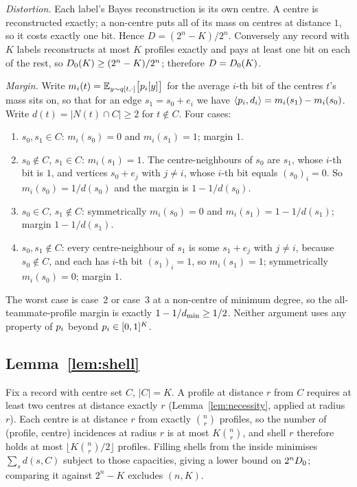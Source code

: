 \emph{Distortion.} Each label's Bayes reconstruction is its own centre. A centre
is reconstructed exactly; a non-centre puts all of its mass on centres at
distance $1$, so it costs exactly one bit. Hence $D = (2^n - K)/2^n$. Conversely
any record with $K$ labels reconstructs at most $K$ profiles exactly and pays at
least one bit on each of the rest, so $D_0(K) \ge (2^n-K)/2^n$; therefore
$D = D_0(K)$.

\emph{Margin.} Write $m_i(t) = \mathbb{E}_{y \sim q[t,\cdot]}\bigl[p_i[y]\bigr]$
for the average $i$-th bit of the centres $t$'s mass sits on, so that for an edge
$s_1 = s_0 + e_i$ we have
$\langle p_i, d_i \rangle = m_i(s_1) - m_i(s_0)$. Write
$d(t) = |N(t) \cap C| \ge 2$ for $t \notin C$. Four cases:
\begin{enumerate}
\item $s_0, s_1 \in C$: $m_i(s_0) = 0$ and $m_i(s_1) = 1$; margin $1$.
\item $s_0 \notin C$, $s_1 \in C$: $m_i(s_1) = 1$. The centre-neighbours of $s_0$
      are $s_1$, whose $i$-th bit is $1$, and vertices $s_0 + e_j$ with
      $j \ne i$, whose $i$-th bit equals $(s_0)_i = 0$. So $m_i(s_0) = 1/d(s_0)$
      and the margin is $1 - 1/d(s_0)$.
\item $s_0 \in C$, $s_1 \notin C$: symmetrically $m_i(s_0) = 0$ and
      $m_i(s_1) = 1 - 1/d(s_1)$; margin $1 - 1/d(s_1)$.
\item $s_0, s_1 \notin C$: every centre-neighbour of $s_1$ is some $s_1 + e_j$
      with $j \ne i$, because $s_0 \notin C$, and each has $i$-th bit
      $(s_1)_i = 1$, so $m_i(s_1) = 1$; symmetrically $m_i(s_0) = 0$; margin $1$.
\end{enumerate}
The worst case is case~2 or case~3 at a non-centre of minimum degree, so the
all-teammate-profile margin is exactly $1 - 1/d_{\min} \ge 1/2$. Neither argument
uses any property of $p_i$ beyond $p_i \in [0,1]^K$.

\subsection{Lemma~\ref{lem:shell}}

Fix a record with centre set $C$, $|C| = K$. A profile at distance $r$ from $C$
requires at least two centres at distance exactly $r$
(Lemma~\ref{lem:necessity}, applied at radius $r$). Each centre is at distance
$r$ from exactly $\binom{n}{r}$ profiles, so the number of (profile, centre)
incidences at radius $r$ is at most $K\binom{n}{r}$, and shell $r$ therefore
holds at most $\lfloor K\binom{n}{r}/2\rfloor$ profiles. Filling shells from the
inside minimises $\sum_s d(s,C)$ subject to those capacities, giving a lower
bound on $2^n D_0$; comparing it against $2^n - K$ excludes $(n,K)$.

